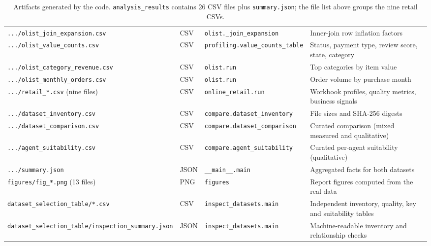 \documentclass[11pt,a4paper]{article}
\newcommand{\code}[1]{\texttt{#1}}
\begin{document}
\begin{table}[H]
\begin{tabularx}{\textwidth}{L{5.0cm}L{1.6cm}L{4.2cm}X}
\code{.../olist\_join\_expansion.csv} & CSV & \code{olist.\_join\_expansion} & Inner-join row inflation factors \\
\code{.../olist\_value\_counts.csv} & CSV & \code{profiling.value\_counts\_table} & Status, payment type, review score, state, category \\
\code{.../olist\_category\_revenue.csv} & CSV & \code{olist.run} & Top categories by item value \\
\code{.../olist\_monthly\_orders.csv} & CSV & \code{olist.run} & Order volume by purchase month \\
\code{.../retail\_*.csv} (nine files) & CSV & \code{online\_retail.run} & Workbook profiles, quality metrics, business signals \\
\code{.../dataset\_inventory.csv} & CSV & \code{compare.dataset\_inventory} & File sizes and SHA-256 digests \\
\code{.../dataset\_comparison.csv} & CSV & \code{compare.dataset\_comparison} & Curated comparison (mixed measured and qualitative) \\
\code{.../agent\_suitability.csv} & CSV & \code{compare.agent\_suitability} & Curated per-agent suitability (qualitative) \\
\code{.../summary.json} & JSON & \code{\_\_main\_\_.main} & Aggregated facts for both datasets \\
\code{figures/fig\_*.png} (13 files) & PNG & \code{figures} & Report figures computed from the real data \\
\code{dataset\_selection\_table/*.csv} & CSV & \code{inspect\_datasets.main} & Independent inventory, quality, key and suitability tables \\
\code{dataset\_selection\_table/\linebreak inspection\_summary.json} & JSON & \code{inspect\_datasets.main} & Machine-readable inventory and relationship checks \\
\bottomrule
\end{tabularx}
\caption{Artifacts generated by the code. \code{analysis\_results} contains 26 CSV files plus \code{summary.json}; the file list above groups the nine retail CSVs.}
\label{tab:outputs}
\end{table}
\end{document}
